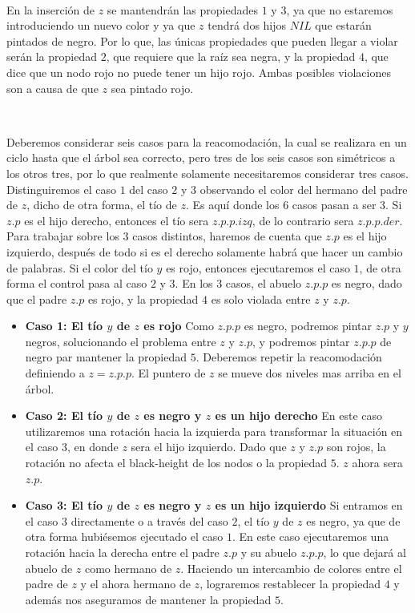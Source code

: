 \documentclass[10pt, a4paper]{report}
\begin{document}
~

En la inserci\'on de $z$ se mantendr\'an las propiedades $1$ y $3$, ya que no estaremos introduciendo un nuevo color y ya que $z$ tendr\'a dos hijos $NIL$ que estar\'an pintados de negro. Por lo que, las \'unicas propiedades que pueden llegar a violar ser\'an la propiedad $2$, que requiere que la ra\'iz sea negra, y la propiedad $4$, que dice que un nodo rojo no puede tener un hijo rojo. Ambas posibles violaciones son a causa de que $z$ sea pintado rojo.

~

Deberemos considerar seis casos para la reacomodaci\'on, la cual se realizara en un ciclo hasta que el \'arbol sea correcto, pero tres de los seis casos son sim\'etricos a los otros tres, por lo que realmente solamente necesitaremos considerar tres casos. Distinguiremos el caso $1$ del caso $2$ y $3$ observando el color del hermano del padre de $z$, dicho de otra forma, el t\'io de $z$. Es aqu\'i donde los $6$ casos pasan a ser $3$. Si $z.p$ es el hijo derecho, entonces el t\'io sera $z.p.p.izq$, de lo contrario sera $z.p.p.der$. Para trabajar sobre los $3$ casos distintos, haremos de cuenta que $z.p$ es el hijo izquierdo, despu\'es de todo si es el derecho solamente habr\'a que hacer un cambio de palabras. Si el color del t\'io $y$ es rojo, entonces ejecutaremos el caso $1$, de otra forma el control pasa al caso $2$ y $3$. En los $3$ casos, el abuelo $z.p.p$ es negro, dado que el padre $z.p$ es rojo, y la propiedad $4$ es solo violada entre $z$ y $z.p$.

\begin{itemize}
 \item \textbf{Caso 1: El t\'io $y$ de $z$ es rojo} Como $z.p.p$ es negro, podremos pintar $z.p$ y $y$ negros, solucionando el problema entre $z$ y $z.p$, y podremos pintar $z.p.p$ de negro par mantener la propiedad $5$. Deberemos repetir la reacomodaci\'on definiendo a $z = z.p.p$. El puntero de $z$ se mueve dos niveles mas arriba en el \'arbol.
 \item \textbf{Caso 2: El t\'io $y$ de $z$ es negro y $z$ es un hijo derecho} En este caso utilizaremos una rotaci\'on hacia la izquierda para transformar la situaci\'on en el caso $3$, en donde $z$ sera el hijo izquierdo. Dado que $z$ y $z.p$ son rojos, la rotaci\'on no afecta el black-height de los nodos o la propiedad $5$. $z$ ahora sera $z.p$.
 \item \textbf{Caso 3: El t\'io $y$ de $z$ es negro y $z$ es un hijo izquierdo} Si entramos en el caso $3$ directamente o a trav\'es del caso $2$, el t\'io $y$ de $z$ es negro, ya que de otra forma hubi\'esemos ejecutado el caso $1$. En este caso ejecutaremos una rotaci\'on hacia la derecha entre el padre $z.p$ y su abuelo $z.p.p$, lo que dejar\'a al abuelo de $z$ como hermano de $z$. Haciendo un intercambio de colores entre el padre de $z$ y el ahora hermano de $z$, lograremos restablecer la propiedad $4$ y adem\'as nos aseguramos de mantener la propiedad $5$.
 \end{itemize}
\end{document}
